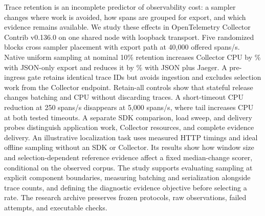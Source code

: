 Trace retention is an incomplete predictor of observability cost: a sampler changes where work is avoided, how spans are grouped for export, and which evidence remains available. We study these effects in OpenTelemetry Collector Contrib v0.136.0 on one shared node with loopback transport. Five randomized blocks cross sampler placement with export path at 40,000 offered spans/s. Native uniform sampling at nominal 10\% retention increases Collector CPU by \PlacementFileUniformIncrease{}\% with JSON-only export and reduces it by \PlacementDualUniformSaving{}\% with JSON plus Jaeger. A pre-ingress gate retains identical trace IDs but avoids ingestion and excludes selection work from the Collector endpoint. Retain-all controls show that stateful release changes batching and CPU without discarding traces. A short-timeout CPU reduction at 250 spans/s disappears at 5,000 spans/s, where tail increases CPU at both tested timeouts. A separate SDK comparison, load sweep, and delivery probes distinguish application work, Collector resources, and complete evidence delivery. An illustrative localization task uses measured HTTP timings and ideal offline sampling without an SDK or Collector. Its results show how window size and selection-dependent reference evidence affect a fixed median-change scorer, conditional on the observed corpus. The study supports evaluating sampling at explicit component boundaries, measuring batching and serialization alongside trace counts, and defining the diagnostic evidence objective before selecting a rate. The research archive preserves frozen protocols, raw observations, failed attempts, and executable checks.
